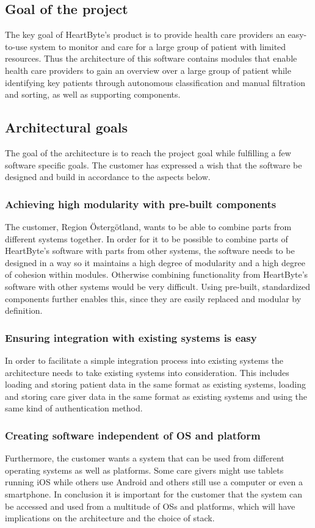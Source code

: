\documentclass{article}
\begin{document}
\subsection{Goal of the project}
The key goal of HeartByte's product is to provide health care providers an easy-to-use system to monitor and care for a large group of patient with limited resources. Thus the architecture of this software contains modules that enable health care providers to gain an overview over a large group of patient while identifying key patients through autonomous classification and manual filtration and sorting, as well as supporting components.

\subsection{Architectural goals}
The goal of the architecture is to reach the project goal while fulfilling a few software specific goals. The customer has expressed a wish that the software be designed and build in accordance to the aspects below.

\subsubsection{Achieving high modularity with pre-built components}
The customer, Region Östergötland, wants to be able to combine parts from different systems together. In order for it to be possible to combine parts of HeartByte's software with parts from other systems, the software needs to be designed in a way so it maintains a high degree of modularity and a high degree of cohesion within modules. Otherwise combining functionality from HeartByte's software with other systems would be very difficult. Using pre-built, standardized components further enables this, since they are easily replaced and modular by definition.

\subsubsection{Ensuring integration with existing systems is easy}
In order to facilitate a simple integration process into existing systems the architecture needs to take existing systems into consideration. This includes loading and storing patient data in the same format as existing systems, loading and storing care giver data in the same format as existing systems and using the same kind of authentication method.

\subsubsection{Creating software independent of OS and platform}
Furthermore, the customer wants a system that can be used from different operating systems as well as platforms. Some care givers might use tablets running iOS while others use Android and others still use a computer or even a smartphone. In conclusion it is important for the customer that the system can be accessed and used from a multitude of OSs and platforms, which will have implications on the architecture and the choice of stack. 
\end{document}
